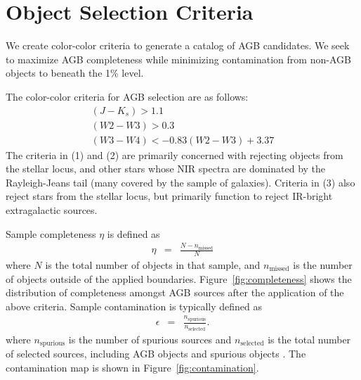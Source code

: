 \section{Object Selection Criteria}
\label{sec:criteria}
We create color-color criteria to generate a catalog of AGB candidates. We seek to maximize AGB completeness while minimizing contamination from non-AGB objects to beneath the 1\% level.

The color-color criteria for AGB selection are as follows:
\begin{align} 
(J-K_s) > 1.1\label{eq:criteria1}\\
(W2-W3) > 0.3\label{eq:criteria2}\\
(W3-W4) < -0.83(W2-W3) + 3.37\label{eq:criteria3}
\end{align}
The criteria in (1) and (2) are primarily concerned with rejecting objects from the stellar locus, and other stars whose NIR spectra are dominated by the Rayleigh-Jeans tail (many covered by the sample of galaxies).  Criteria in (3) also reject stars from the stellar locus, but primarily function to reject IR-bright extragalactic sources.

\noindent Sample completeness $\eta$ is defined as
\begin{eqnarray*}
\eta &=& \frac{N - n_\text{missed}}{N}
\end{eqnarray*}
where $N$ is the total number of objects in that sample, and $n_\text{missed}$ is the number of objects outside of the applied boundaries. Figure~\ref{fig:completeness} shows the distribution of completeness amongst AGB sources after the application of the above criteria. Sample contamination is typically defined as
\begin{eqnarray*}
\epsilon &=& \frac{n_\text{spurious}}{n_\text{selected}}.
\end{eqnarray*}
where $n_\text{spurious}$ is the number of spurious sources and $n_\text{selected}$ is the total number of selected sources, including AGB objects and spurious objects \citep{2013sdmm.book.....I}. The contamination map is shown in Figure~\ref{fig:contamination}.

